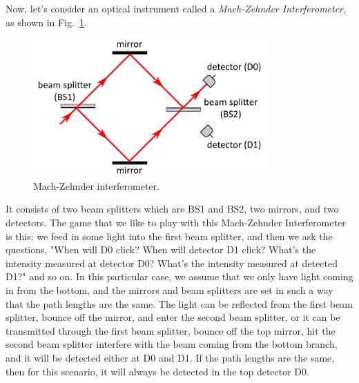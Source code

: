 Now, let's consider an optical instrument called a \emph{Mach-Zehnder Interferometer}, as shown in Fig.~\ref{fig:mach-zehnder}.
\begin{figure}[H]
   \centering
    \includegraphics[width=0.8\textwidth]{lesson6/mach_zehnder.pdf}
    
        \caption{Mach-Zehnder interferometer.}
    \label{fig:mach-zehnder}
    
\end{figure}
It consists of two beam splitters which are BS1 and BS2, two mirrors, and two detectors.  The game that we like to play with this Mach-Zehnder Interferometer is this: we feed in some light into the first beam splitter, and then we ask the questions, "When will D0 click?  When will detector D1 click? What's the intensity measured at detector D0? What's the intensity measured at detected D1?" and so on. In this particular case, we assume that we only have light coming in from the bottom, and the mirrors and beam splitters are set in such a way that the path lengths are the same. The light can be reflected from the first beam splitter, bounce off the mirror, and enter the second beam splitter, or it can be transmitted through the first beam splitter, bounce off the top mirror, hit the second beam splitter interfere with the beam coming from the bottom branch, and it will be detected either at D0 and D1. If the path lengths are the same, then for this scenario, it will always be detected in the top detector D0.

